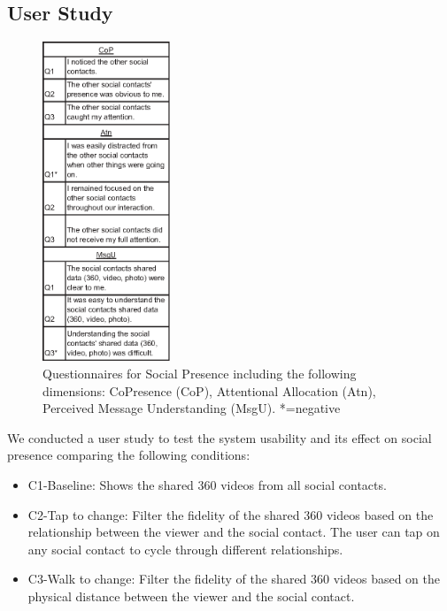 \subsection{User Study}

\begin{figure}[ht]
    \centering
    \includegraphics[width=1.5in]{images/chi/images-02.eps}
    \caption{Questionnaires for Social Presence including the following dimensions: CoPresence (CoP), Attentional Allocation (Atn), Perceived Message Understanding (MsgU). *=negative} 
      \label{tbl:questions}
\end{figure}

We conducted a user study to test the system usability and its effect on social presence comparing the following conditions: 

\begin{itemize}
    \item C1-Baseline: Shows the shared 360 videos from all social contacts.
    \item C2-Tap to change: Filter the fidelity of the shared 360 videos based on the relationship between the viewer and the social contact. The user can tap on any social contact to cycle through different relationships.
    \item C3-Walk to change: Filter the fidelity of the shared 360 videos based on the physical distance between the viewer and the social contact.
\end{itemize}

